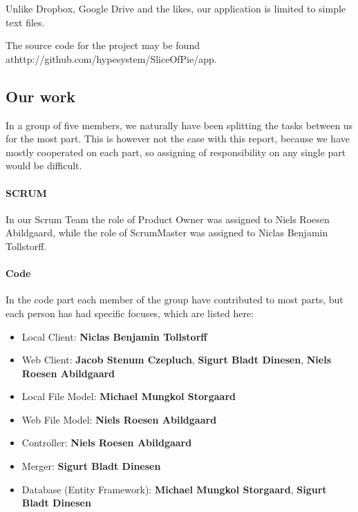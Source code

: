 Unlike Dropbox, Google Drive and the likes, our application is limited to simple text files.

The source code for the project may be found at\newline http://github.com/hypesystem/SliceOfPie/app.

\subsection{Our work}
In a group of five members, we naturally have been splitting the tasks between us for the most part. This is however not the case with this report, because we have mostly cooperated on each part, so assigning of responsibility on any single part would be difficult.

\paragraph{SCRUM}
In our Scrum Team the role of Product Owner was assigned to Niels Roesen Abildgaard, while the role of ScrumMaster was assigned to Niclas Benjamin Tollstorff.

\paragraph{Code}
In the code part each member of the group have contributed to most parts, but each person has had specific focuses, which are listed here:\\

\begin{itemize}
\item Local Client: \textbf{Niclas Benjamin Tollstorff}
\item Web Client: \textbf{Jacob Stenum Czepluch}, \textbf{Sigurt Bladt Dinesen}, \textbf{Niels Roesen Abildgaard}
\item Local File Model: \textbf{Michael Mungkol Storgaard}
\item Web File Model: \textbf{Niels Roesen Abildgaard}
\item Controller: \textbf{Niels Roesen Abildgaard}
\item Merger: \textbf{Sigurt Bladt Dinesen}
\item Database (Entity Framework): \textbf{Michael Mungkol Storgaard}, \textbf{Sigurt Bladt Dinesen}
\end{itemize}
